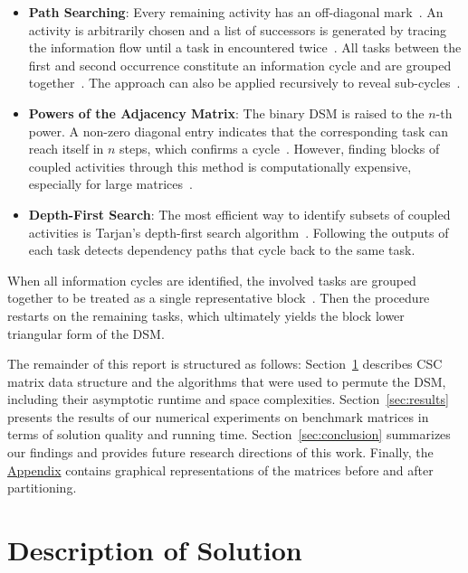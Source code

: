 \documentclass[12pt]{article}
\theoremstyle{definition}
\begin{document}
\begin{itemize}
	\item \textbf{Path Searching}: Every remaining activity has an off-diagonal mark~\cite{eppinger2012}. An activity is arbitrarily chosen and a list of successors is generated by tracing the information flow until a task in encountered twice~\cite{sargentwesterberg1964,steward1981}. All tasks between the first and second occurrence constitute an information cycle and are grouped together~\cite{Yassine2001AnIT}. The approach can also be applied recursively to reveal sub-cycles~\cite{eppinger2012}.
	\item \textbf{Powers of the Adjacency Matrix}: The binary DSM is raised to the $n$-th power. A non-zero diagonal entry indicates that the corresponding task can reach itself in $n$ steps, which confirms a cycle~\cite{Yassine2001AnIT,warfield1973}. However, finding blocks of coupled activities through this method is computationally expensive, especially for large matrices~\cite{eppinger2012}.
	\item \textbf{Depth-First Search}: The most efficient way to identify subsets of coupled activities is Tarjan's depth-first search algorithm~\cite{eppinger2012,TARJANalgo}. Following the outputs of each task detects dependency paths that cycle back to the same task.
\end{itemize}

When all information cycles are identified, the involved tasks are grouped together to be treated as a single representative block~\cite{Yassine2001AnIT}. Then the procedure restarts on the remaining tasks, which ultimately yields the block lower triangular form of the DSM.

\vspace{1em}

The remainder of this report is structured as follows: Section~\ref{sec:solution} describes CSC matrix data structure and the algorithms that were used to permute the DSM, including their asymptotic runtime and space complexities. Section~\ref{sec:results} presents the results of our numerical experiments on benchmark matrices in terms of solution quality and running time. Section~\ref{sec:conclusion} summarizes our findings and provides future research directions of this work. Finally, the \hyperref[sec:appendix]{Appendix} contains graphical representations of the matrices before and after partitioning.


\section{Description of Solution}\label{sec:solution}
\end{document}
